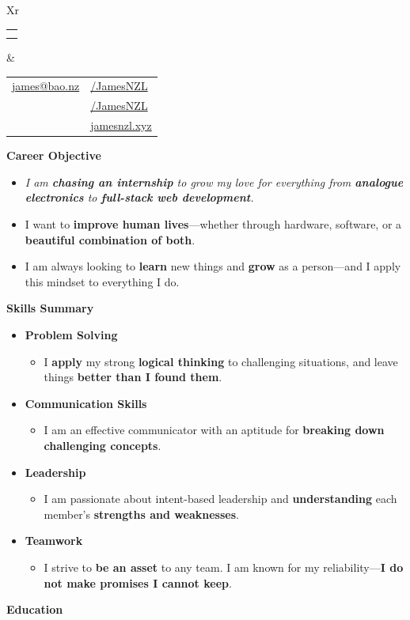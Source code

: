 \documentclass[11pt,a4paper]{article}[leftmargin=*]
\makeatletter
\def \fullname {James Bao}
\def \subtitle {}
\def \emailicon {\faAt}
\def \emaillink {mailto:james@bao.nz}
\def \emailtext {james@bao.nz}
\def \phoneicon {\faMobile}
\def \phonetext {+64 22 410 1580}
\def \addressicon {\faMapMarker*}
\def \addresstext {Auckland, New Zealand}
\def \linkedinicon {\faLinkedin}
\def \linkedinlink {https://www.linkedin.com/in/jamesnzl/}
\def \linkedintext {/JamesNZL}
\def \githubicon {\faGithub}
\def \githublink {https://github.com/jamesnzl}
\def \githubtext {/JamesNZL}
\def \websiteicon {\faGlobe}
\def \websitelink {https://jamesnzl.xyz/}
\def \websitetext {jamesnzl.xyz}
\def \headertype {\doublecol} %
\def \entryspacing {-0pt}
\def \bulletstylei {\faAngleRight\hspace{-4.5pt}}
\def \email {\emailicon \hspace{3pt}\href{\emaillink}{\emailtext}}
\def \phone {\phoneicon \hspace{3pt}{ \phonetext}}
\def \address {\addressicon \hspace{3pt}{\addresstext}}
\def \linkedin {\linkedinicon \hspace{3pt}\href{\linkedinlink}{\linkedintext}}
\def \github {\githubicon \hspace{3pt}\href{\githublink}{\githubtext}}
\def \website {\websiteicon \hspace{3pt}\href{\websitelink}{\websitetext}}
\renewcommand{\section}[2]{\vspace{5pt}
  \colorbox{secondary}{\color{white}\raggedbottom\normalsize\textbf{{#1}{\hspace{2pt}#2\hspace{4pt}}}}
}
\newcommand{\resumeEntryStart}{\begin{itemize}[leftmargin=2.5mm]}
\newcommand{\resumeEntryEnd}{\end{itemize}\vspace{\entryspacing}}
\newcommand{\resumeItemListStart}{\begin{itemize}[leftmargin=4.5mm]}
\newcommand{\resumeItemListEnd}{\end{itemize}}
\newcommand{\resumeItem}[2][\bulletstylei]{
  \item[\small#1]\small{
    {#2 \vspace{-2pt}}
  }
}
\newcommand{\resumeEntryS}[2]{
  \item[]\small{
    \textbf{\color{primary}#1 }{ #2 \vspace{-4pt}}
  }
}
\newcommand{\resumeEntryE}[1]{
  \item[]\small{
    \resumeIt{\small#1 \vspace{-4pt}}
  }\\
}
\newcommand{\resumeEntryP}[1]{
  \item[]\small{
    #1 \vspace{-4pt}
  }\\
}
\newcommand{\resumeIt}[1]{\textit{\color{accent}#1}}
\newcommand{\resumeBf}[1]{\small\textbf{\color{halfbold}#1}}
\newcommand{\doublecol}[6]{
  \begin{tabularx}{\textwidth}{Xr}
    {
      \begin{tabular}[c]{l}
        \fontsize{35}{45}\selectfont{\color{primary}{{\textbf{\fullname}}}} \\
        {\textit{\subtitle}} %
      \end{tabular}
    } & {
      \begin{tabular}[c]{l@{\hspace{1.5em}}l}
        {\small#4} & {\small#1} \\
        {\small#5} & {\small#2} \\
        {\small#6} & {\small#3}
      \end{tabular}
    }
  \end{tabularx}
}
\newcommand{\singlecol}[6]{
  \begin{tabularx}{\textwidth}{Xr}
    {
      \begin{tabular}[b]{l}
        \fontsize{35}{45}\selectfont{\color{primary}{{\textbf{\fullname}}}} \\
        {\textit{\subtitle}} %
      \end{tabular}
    } & {
      \begin{tabular}[c]{l}
        {\small#1} \\
        {\small#2} \\
        {\small#3} \\
        {\small#4} \\
        {\small#5} \\
        {\small#6}
      \end{tabular}
    }
  \end{tabularx}
}
\makeatother
\begin{document}

\headertype{\linkedin}{\github}{\website}{\email}{\phone}{\address} %
\vspace{-10pt} %


\section{\faCrosshairs}{Career Objective}

\resumeEntryStart
\resumeEntryE{I am \resumeBf{chasing an internship} to grow my love for everything from \resumeBf{analogue electronics} to \resumeBf{full-stack web development}.}

\resumeEntryP{I want to \resumeBf{improve human lives}---whether through hardware, software, or a \resumeBf{beautiful combination of both}.}

\resumeEntryP{I am always looking to \resumeBf{learn} new things and \resumeBf{grow} as a person—and I apply this mindset to everything I do.}
\resumeEntryEnd


\section{\faAngleDoubleUp}{Skills Summary}

\resumeEntryStart
\resumeEntryS{Problem Solving}{}
\resumeItemListStart
\resumeItem{
  I \resumeBf{apply} my strong \resumeBf{logical thinking} to challenging situations, and leave things \resumeBf{better than I found them}.
}
\resumeItemListEnd

\resumeEntryS{Communication Skills}{}
\resumeItemListStart
\resumeItem{
  I am an effective communicator with an aptitude for \resumeBf{breaking down challenging concepts}.
}
\resumeItemListEnd

\resumeEntryS{Leadership}{}
\resumeItemListStart
\resumeItem{
  I am passionate about intent-based leadership and \resumeBf{understanding} each member's \resumeBf{strengths and weaknesses}.
}
\resumeItemListEnd

\resumeEntryS{Teamwork}{}
\resumeItemListStart
\resumeItem{
  I strive to \resumeBf{be an asset} to any team. I am known for my reliability---\resumeBf{I do not make promises I cannot keep}.
}
\resumeItemListEnd
\resumeEntryEnd

\section{\faGraduationCap}{Education}
\end{document}
